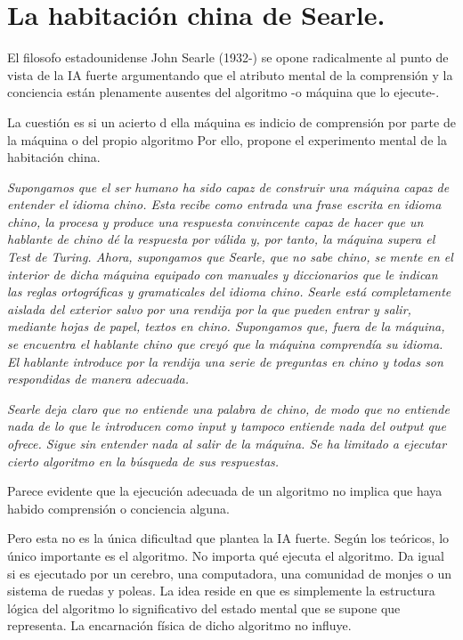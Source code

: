 \documentclass[main.tex]{subfiles}
\begin{document}
\section{La habitación china de Searle.}

El filosofo estadounidense John Searle (1932-) se opone radicalmente al punto de vista de la IA fuerte argumentando que el atributo mental de la comprensión y la conciencia están plenamente ausentes del algoritmo -o máquina que lo ejecute-.

La cuestión es si un acierto d ella máquina es indicio de comprensión por parte de la máquina o del propio algoritmo Por ello, propone el experimento mental de la habitación china.

\textit{Supongamos que el ser humano ha sido capaz de construir una máquina capaz de entender el idioma chino. Esta recibe como entrada una frase escrita en idioma chino, la procesa y produce una respuesta convincente capaz de hacer que un hablante de chino dé la respuesta por válida y, por tanto, la máquina supera el Test de Turing. Ahora, supongamos que Searle, que no sabe chino, se mente en el interior de dicha máquina equipado con manuales y diccionarios que le indican las reglas ortográficas y gramaticales del idioma chino. Searle está completamente aislada del exterior salvo por una rendija por la que pueden entrar y salir, mediante hojas de papel, textos en chino. Supongamos que, fuera de la máquina, se encuentra el hablante chino que  creyó que la máquina comprendía su idioma. El hablante introduce por la rendija una serie de preguntas en chino y todas son respondidas de manera adecuada.}

\textit{Searle deja claro que no entiende una palabra de chino, de modo que no entiende nada de lo que le introducen como input y tampoco entiende nada del output que ofrece. Sigue sin entender nada al salir de la máquina. Se ha limitado a ejecutar cierto algoritmo en la búsqueda de sus respuestas.}


Parece evidente que la ejecución adecuada de un algoritmo no implica que haya habido comprensión o conciencia alguna.

Pero esta no es la única dificultad que plantea la IA fuerte. Según los teóricos, lo único importante es el algoritmo. No importa qué ejecuta el algoritmo. Da igual si es ejecutado por un cerebro, una computadora, una comunidad de monjes o un sistema de ruedas y poleas. La idea reside en que es simplemente la estructura lógica del algoritmo lo significativo del estado mental que se supone que representa. La encarnación física de dicho algoritmo no influye.
\end{document}
